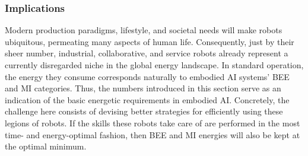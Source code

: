\subsubsection{Implications}
Modern production paradigms, lifestyle, and societal needs will make robots ubiquitous, permeating many aspects of human life. Consequently, just by their sheer number, industrial, collaborative, and service robots already represent a currently disregarded niche in the global energy landscape. In standard operation, the energy they consume corresponds naturally to embodied AI systems' BEE and MI categories. Thus, the numbers introduced in this section serve as an indication of the basic energetic requirements in embodied AI. Concretely, the challenge here consists of devising better strategies for efficiently using these legions of robots. If the skills these robots take care of are performed in the most time- and energy-optimal fashion, then BEE and MI energies will also be kept at the optimal minimum.
